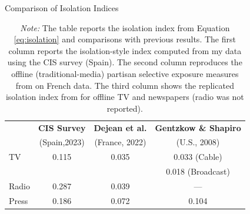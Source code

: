 \documentclass[12pt]{article}
\begin{document}
	
	\begin{table}[H]
		\caption{Comparison of Isolation Indices}
		\label{tab:isolation_table_compare}
		\centering
		\begin{tabular}{lccc}
			\hline
 & \textbf{CIS Survey} & \textbf{Dejean et al.} & \textbf{Gentzkow \& Shapiro} \\
			&  (Spain,2023) & (France, 2022) &  (U.S., 2008) \\
			\hline
			TV & 0.115 & 0.035 & 0.033 \scriptsize{(Cable)}\\
						 &  &  & \hspace{0.45cm} 0.018 \scriptsize{(Broadcast)} \\
			Radio & 0.287 & 0.039 & — \\
			Press & 0.186 & 0.072 & 0.104\\
			\hline
		\end{tabular}
			\caption*{\small  \textit{Note:} The table reports the isolation index from Equation \eqref{eq:isolation} and comparisons with previous results. 
				The first column reports the isolation-style index computed from my data using the CIS survey (Spain).
				The second column reproduces the offline (traditional-media) partisan selective exposure measures from \cite{Dejean2022PartisanSE} on French data. 
				The third column shows the replicated isolation index from \cite{gentzkow_isolation} for offline TV and newspapers (radio was not reported).}
		
	\end{table}
	
\end{document}
